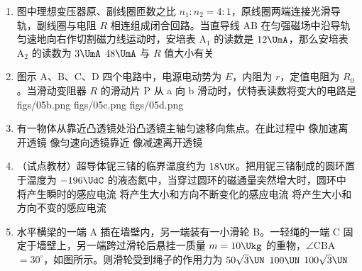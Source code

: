 \documentclass[\gkver]{gaokaozhenti}
\begin{document}
\begin{enumerate}
\item
图中理想变压器原、副线圈匝数之比 $n_{1}:n_{2} = 4:1$，原线圈两端连接光滑导轨，副线圈与电阻 $R$ 相连组成闭合回路。当直导线 AB 在匀强磁场中沿导轨匀速地向右作切割磁力线运动时，安培表 A$_{1}$ 的读数是 $12\UmA$，那么安培表 A$_{2}$ 的读数为
\onepicture[w=6cm]{}
{$3\UmA$}
{$48\UmA$}
{与 $R$ 值大小有关}

\item
图示 A、B、C、D 四个电路中，电源电动势为 $E$，内阻为 $r$，定值电阻为 $R_{0}$。当滑动变阻器 $R$ 的滑动片 P 从 a 向 b 滑动时，伏特表读数将变大的电路是
{figs/05b.png}
{figs/05c.png}
{figs/05d.png}

\item
有一物体从靠近凸透镜处沿凸透镜主轴匀速移向焦点。在此过程中
{像加速离开透镜}
{像匀速向透镜靠近}
{像减速离开透镜}

\item
（试点教材）超导体铌三锗的临界温度约为 $18\UK$。把用铌三锗制成的圆环置于温度为 $-196\UdC$ 的液态氮中，当穿过圆环的磁通量突然增大时，圆环中
{将产生瞬时的感应电流}
{将产生大小和方向不断变化的感应电流}
{将产生大小和方向不变的感应电流}

\item
水平横梁的一端 A 插在墙壁内，另一端装有一小滑轮 B。一轻绳的一端 C 固定于墙壁上，另一端跨过滑轮后悬挂一质量 $m = 10\Ukg$ 的重物，$\angle$CBA $= 30^{\circ}$，如图所示。则滑轮受到绳子的作用力为
\onepicture[w=4cm]{}
\fourchoices[answer=C]
{$50\UN$}
{$50\sqrt{3}\UN$}
{$100\UN$}
{$100\sqrt{3}\UN$}


\end{enumerate}
\end{document}
